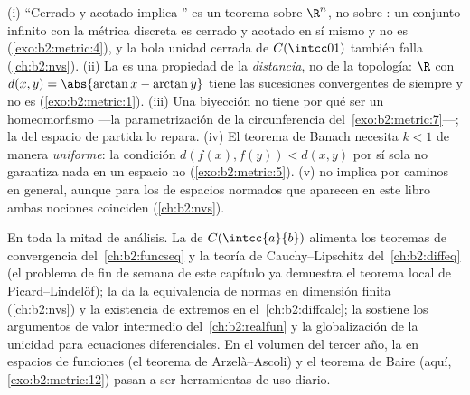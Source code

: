 \begin{remark}\label{rem:b2:metric:pitfalls}
(i) ``Cerrado y acotado implica '' es un teorema sobre
$\R^n$, no sobre : un conjunto infinito con la
métrica discreta es cerrado y acotado en sí mismo y no es
 (\cref{exo:b2:metric:4}), y la bola unidad cerrada de
$C(\intcc01)$ también falla (\cref{ch:b2:nvs}). (ii) La
 es una propiedad de la \emph{distancia}, no de la
topología: $\R$ con $d(x,y) = \abs{\arctan x - \arctan y}$ tiene
las sucesiones convergentes de siempre y no es 
(\cref{exo:b2:metric:1}). (iii) Una biyección  no tiene por
qué ser un homeomorfismo ---la parametrización de la circunferencia
del~\cref{exo:b2:metric:7}---; la  del espacio de partida
lo repara. (iv) El teorema de Banach necesita $k < 1$ de manera
\emph{uniforme}: la condición $d(f(x), f(y)) < d(x,y)$ por sí sola
no garantiza nada en un espacio no 
(\cref{exo:b2:metric:5}). (v)  no implica  por
caminos en general, aunque para los  de espacios normados
que aparecen en este libro ambas nociones coinciden
(\cref{ch:b2:nvs}).
\end{remark}

\begin{remark}
En toda la mitad de análisis. La  de $C(\intcc{a}{b})$
alimenta los teoremas de convergencia del~\cref{ch:b2:funcseq} y la
teoría de Cauchy--Lipschitz del~\cref{ch:b2:diffeq} (el problema de
fin de semana de este capítulo ya demuestra el teorema local de
Picard--Lindelöf); la  da la equivalencia de normas en
dimensión finita (\cref{ch:b2:nvs}) y la existencia de extremos en
el~\cref{ch:b2:diffcalc}; la  sostiene los argumentos de
valor intermedio del~\cref{ch:b2:realfun} y la globalización de la
unicidad para ecuaciones diferenciales. En el volumen del tercer
año, la  en espacios de funciones (el teorema de
Arzelà--Ascoli) y el teorema de Baire (aquí,
\cref{exo:b2:metric:12}) pasan a ser herramientas de uso diario.
\end{remark}

